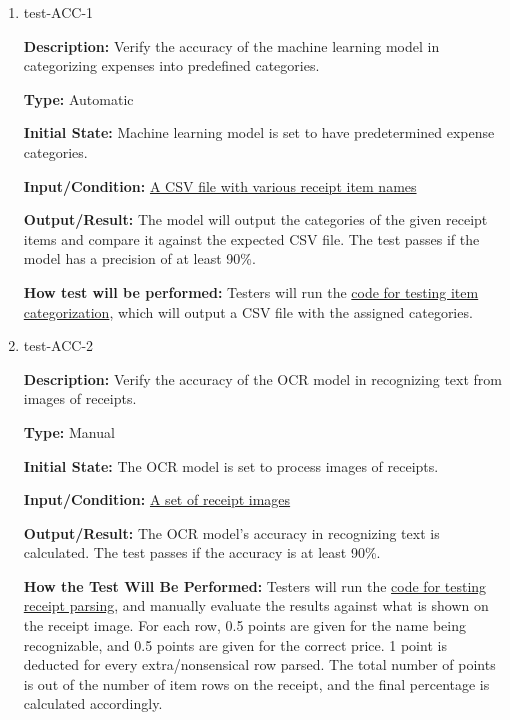 \documentclass[12pt, titlepage]{article}
\begin{document}
\begin{enumerate}

\item{test-ACC-1\\}

\textbf{Description:} Verify the accuracy of the machine learning model in
categorizing expenses into predefined categories.

\textbf{Type:} Automatic
					
\textbf{Initial State:} Machine learning model is set to have predetermined
expense categories.
					
\textbf{Input/Condition:}
\href{https://github.com/PlutosCapstone/Plutos/tree/main/src/server/tests/imageProcessing/data/categorization/receipt_items_input.csv}{A
CSV file with various receipt item names}
					
\textbf{Output/Result:} The model will output the categories of the given
receipt items and compare it against the expected CSV file. The test passes if
the model has a precision of at least 90\%.
					
\textbf{How test will be performed:} Testers will run the
\href{https://github.com/PlutosCapstone/Plutos/tree/main/src/server/tests/imageProcessing/test_categorization.py}{code
for testing item categorization}, which will output a CSV file with the assigned
categories. 


\item{test-ACC-2\\}

\textbf{Description:} Verify the accuracy of the OCR model in recognizing text
from images of receipts.

\textbf{Type:} Manual
					
\textbf{Initial State:} The OCR model is set to process images of receipts.
					
\textbf{Input/Condition:}
\href{https://github.com/PlutosCapstone/Plutos/tree/main/src/server/tests/imageProcessing/data/parsing}{A
set of receipt images}
					
\textbf{Output/Result:} The OCR model's accuracy in recognizing text is
calculated. The test passes if the accuracy is at least 90\%.
					
\textbf{How the Test Will Be Performed:} Testers will run the
\href{https://github.com/PlutosCapstone/Plutos/tree/main/src/server/tests/imageProcessing/test_parsing.py}{code
for testing receipt parsing}, and manually evaluate the results against what is
shown on the receipt image. For each row, 0.5 points are given for the name
being recognizable, and 0.5 points are given for the correct price. 1 point is
deducted for every extra/nonsensical row parsed. The total number of points is
out of the number of item rows on the receipt, and the final percentage is
calculated accordingly. 




\end{enumerate}
\end{document}
